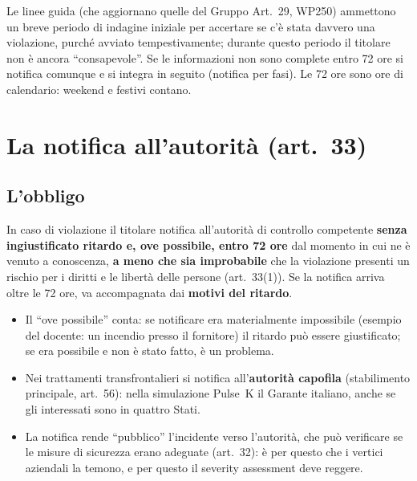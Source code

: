 \begin{integrazione}
Le linee guida (che aggiornano quelle del Gruppo Art.~29, WP250) ammettono un breve periodo di indagine
iniziale per accertare se c'è stata davvero una violazione, purché avviato tempestivamente; durante
questo periodo il titolare non è ancora ``consapevole''. Se le informazioni non sono complete entro 72
ore si notifica comunque e si integra in seguito (notifica per fasi). Le 72 ore sono ore di calendario:
weekend e festivi contano.
\end{integrazione}

\section{La notifica all'autorità (art.~33)}
\label{sec:breach-art33}

\subsection{L'obbligo}
In caso di violazione il titolare notifica all'autorità di controllo competente
\textbf{senza ingiustificato ritardo e, ove possibile, entro 72 ore} dal momento in cui ne è venuto a
conoscenza, \textbf{a meno che sia improbabile} che la violazione presenti un rischio per i diritti e le
libertà delle persone (art.~33(1)). Se la notifica arriva oltre le 72 ore, va accompagnata dai
\textbf{motivi del ritardo}.
\begin{itemize}
  \item Il ``ove possibile'' conta: se notificare era materialmente impossibile (esempio del docente: un
    incendio presso il fornitore) il ritardo può essere giustificato; se era possibile e non è stato
    fatto, è un problema.
  \item Nei trattamenti transfrontalieri si notifica all'\textbf{autorità capofila} (stabilimento
    principale, art.~56): nella simulazione Pulse~K il Garante italiano, anche se gli interessati sono in
    quattro Stati.
  \item La notifica rende ``pubblico'' l'incidente verso l'autorità, che può verificare se le misure di
    sicurezza erano adeguate (art.~32): è per questo che i vertici aziendali la temono, e per questo il
    severity assessment deve reggere.
\end{itemize}

